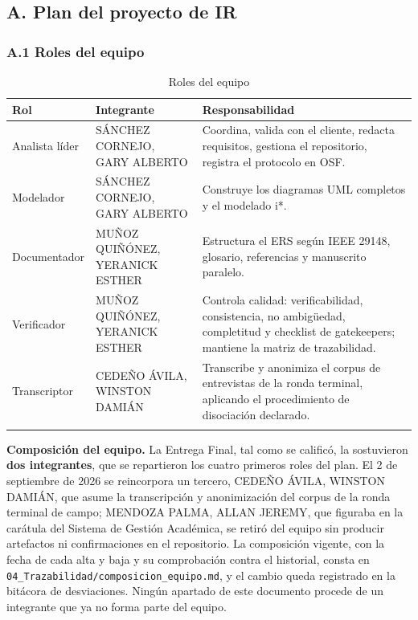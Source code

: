
\subsection*{A. Plan del proyecto de IR}


\subsubsection*{A.1 Roles del equipo}


\begingroup
\small
\begin{longtable}{|P{0.3333}|P{0.3333}|P{0.3333}|}
\hline
Rol & Integrante & Responsabilidad \\ \hline
Analista líder & SÁNCHEZ CORNEJO, GARY ALBERTO & Coordina, valida con el cliente, redacta requisitos, gestiona el repositorio, registra el protocolo en OSF. \\ \hline
Modelador & SÁNCHEZ CORNEJO, GARY ALBERTO & Construye los diagramas UML completos y el modelado i*. \\ \hline
Documentador & MUÑOZ QUIÑÓNEZ, YERANICK ESTHER & Estructura el ERS según IEEE 29148, glosario, referencias y manuscrito paralelo. \\ \hline
Verificador & MUÑOZ QUIÑÓNEZ, YERANICK ESTHER & Controla calidad: verificabilidad, consistencia, no ambigüedad, completitud y checklist de gatekeepers; mantiene la matriz de trazabilidad. \\ \hline
Transcriptor & CEDEÑO ÁVILA, WINSTON DAMIÁN & Transcribe y anonimiza el corpus de entrevistas de la ronda terminal, aplicando el procedimiento de disociación declarado. \\ \hline
\caption{Roles del equipo}
\end{longtable}
\endgroup

\noindent\textbf{Composición del equipo.} La Entrega Final, tal como se calificó, la sostuvieron \textbf{dos integrantes}, que se repartieron los cuatro primeros roles del plan. El 2 de septiembre de 2026 se reincorpora un tercero, CEDEÑO ÁVILA, WINSTON DAMIÁN, que asume la transcripción y anonimización del corpus de la ronda terminal de campo; MENDOZA PALMA, ALLAN JEREMY, que figuraba en la carátula del Sistema de Gestión Académica, se retiró del equipo sin producir artefactos ni confirmaciones en el repositorio. La composición vigente, con la fecha de cada alta y baja y su comprobación contra el historial, consta en \nolinkurl{04_Trazabilidad/composicion_equipo.md}, y el cambio queda registrado en la bitácora de desviaciones. Ningún apartado de este documento procede de un integrante que ya no forma parte del equipo.

